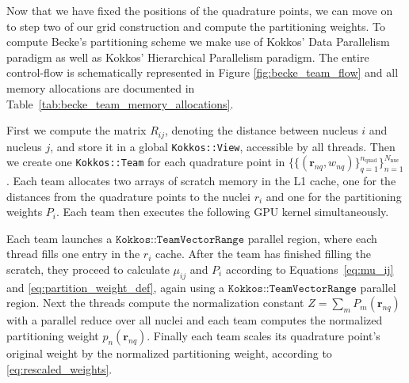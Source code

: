 \documentclass{article}
\begin{document}
Now that we have fixed the positions of the quadrature points, we can move on to
step two of our grid construction and compute the partitioning
weights. To compute Becke's partitioning scheme we make use of
Kokkos' Data Parallelism
paradigm as well as Kokkos' Hierarchical Parallelism paradigm.
The entire control-flow is schematically represented in Figure
\ref{fig:becke_team_flow} and all memory allocations are documented
in Table~\ref{tab:becke_team_memory_allocations}.

First we compute the matrix $R_{ij}$, denoting the distance between
nucleus $i$ and nucleus $j$, and store it in a global
\texttt{Kokkos::View}, accessible by
all threads. Then we create one
\texttt{Kokkos::Team} for each quadrature point in $\{\{(\mathbf r_{nq},
w_{nq})\}_{q=1}^{n_{\text{quad}}}\}_{n=1}^{N_{\text{nuc}}}$. Each
team allocates two arrays of scratch memory in the L1 cache, one for
the distances from the quadrature points to the nuclei $r_i$ and one for
the partitioning weights $P_i$. Each team then executes the following GPU kernel
simultaneously.

Each team launches a
$\texttt{Kokkos::TeamVectorRange}$ parallel region, where each thread
fills one entry in the $r_i$ cache. After the team has finished
filling the scratch, they proceed to calculate $\mu_{ij}$ and
$P_i$ according to Equations~\eqref{eq:mu_ij} and
\eqref{eq:partition_weight_def}, again using a
$\texttt{Kokkos::TeamVectorRange}$ parallel region. Next the
threads compute the normalization constant $Z = \sum_m
P_m(\mathbf{r}_{nq})$ with a parallel reduce over all nuclei
and each team computes the normalized partitioning weight
$p_n(\mathbf{r}_{nq})$. Finally
each team scales its quadrature point's original weight by the normalized
partitioning weight, according to
\eqref{eq:rescaled_weights}.
\end{document}
